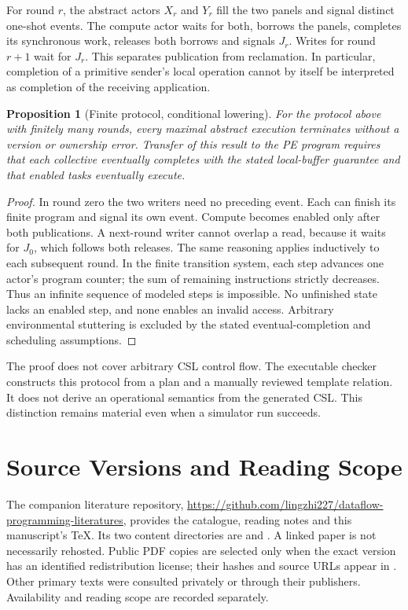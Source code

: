 \documentclass[final,3p,times,authoryear]{elsarticle}
\newtheorem{proposition}{Proposition}
\begin{document}
For round $r$, the abstract actors $X_r$ and $Y_r$ fill the two panels and signal distinct one-shot events. The compute actor waits for both, borrows the panels, completes its synchronous work, releases both borrows and signals $J_r$. Writes for round $r+1$ wait for $J_r$. This separates publication from reclamation. In particular, completion of a primitive sender's local operation cannot by itself be interpreted as completion of the receiving application.

\begin{proposition}[Finite protocol, conditional lowering]
For the protocol above with finitely many rounds, every maximal abstract execution terminates without a version or ownership error. Transfer of this result to the PE program requires that each collective eventually completes with the stated local-buffer guarantee and that enabled tasks eventually execute.
\end{proposition}
\begin{proof}
In round zero the two writers need no preceding event. Each can finish its finite program and signal its own event. Compute becomes enabled only after both publications. A next-round writer cannot overlap a read, because it waits for $J_0$, which follows both releases. The same reasoning applies inductively to each subsequent round. In the finite transition system, each step advances one actor's program counter; the sum of remaining instructions strictly decreases. Thus an infinite sequence of modeled steps is impossible. No unfinished state lacks an enabled step, and none enables an invalid access. Arbitrary environmental stuttering is excluded by the stated eventual-completion and scheduling assumptions.
\end{proof}

The proof does not cover arbitrary CSL control flow. The executable checker constructs this protocol from a plan and a manually reviewed template relation. It does not derive an operational semantics from the generated CSL. This distinction remains material even when a simulator run succeeds.



\section{Source Versions and Reading Scope}\label{app:sources}
The companion literature repository, \url{https://github.com/lingzhi227/dataflow-programming-literatures}, provides the catalogue, reading notes and this manuscript's TeX. Its two content directories are  and . A linked paper is not necessarily rehosted. Public PDF copies are selected only when the exact version has an identified redistribution license; their hashes and source URLs appear in . Other primary texts were consulted privately or through their publishers. Availability and reading scope are recorded separately.
\end{document}

